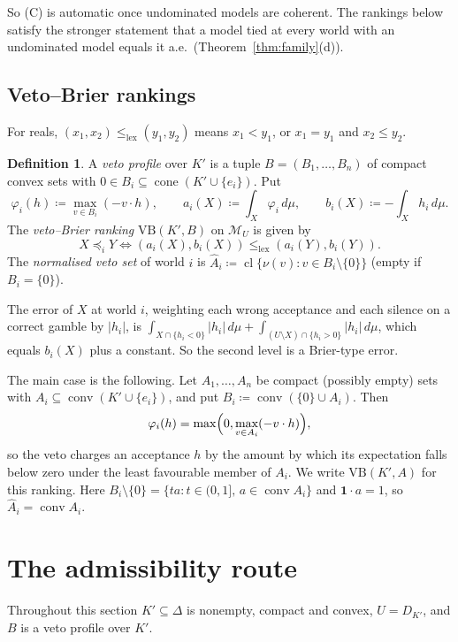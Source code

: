 \documentclass[11pt]{article}
\newcommand{\one}{\mathbf{1}}
\newcommand{\M}{\mathcal{M}}
\newcommand{\lexle}{\le_{\mathrm{lex}}}
\newcommand{\VB}{\mathrm{VB}}
\DeclareMathOperator{\conv}{conv}
\DeclareMathOperator{\cone}{cone}
\DeclareMathOperator{\cl}{cl}
\theoremstyle{plain}
\theoremstyle{definition}
\newtheorem{definition}[theorem]{Definition}
\theoremstyle{remark}
\begin{document}
So (C) is automatic once undominated models are coherent. The rankings below satisfy the
stronger statement that a model tied at every world with an undominated model equals it
a.e.\ (Theorem~\ref{thm:family}(d)).

\subsection{Veto--Brier rankings}

For reals, $(x_1,x_2)\lexle(y_1,y_2)$ means $x_1<y_1$, or $x_1=y_1$ and $x_2\le y_2$.

\begin{definition}\label{def:vb}
A \emph{veto profile} over $K'$ is a tuple $B=(B_1,\dots,B_n)$ of compact convex sets
with $0\in B_i\subseteq\cone(K'\cup\{e_i\})$. Put
\[
  \varphi_i(h)\coloneqq\max_{v\in B_i}(-v\cdot h),\qquad
  a_i(X)\coloneqq\int_X\varphi_i\,d\mu,\qquad
  b_i(X)\coloneqq-\int_Xh_i\,d\mu .
\]
The \emph{veto--Brier ranking} $\VB(K',B)$ on $\M_U$ is given by
\[
  X\preceq_iY\iff(a_i(X),b_i(X))\lexle(a_i(Y),b_i(Y)).
\]
The \emph{normalised veto set} of world $i$ is $\hat A_i\coloneqq\cl\{\nu(v):v\in
B_i\setminus\{0\}\}$ (empty if $B_i=\{0\}$).
\end{definition}

The error of $X$ at world $i$, weighting each wrong acceptance and each silence on a
correct gamble by $|h_i|$, is $\int_{X\cap\{h_i<0\}}|h_i|\,d\mu+\int_{(U\setminus X)
\cap\{h_i>0\}}|h_i|\,d\mu$, which equals $b_i(X)$ plus a constant. So the second level is a
Brier-type error.

The main case is the following. Let $A_1,\dots,A_n$ be compact (possibly empty) sets with
$A_i\subseteq\conv(K'\cup\{e_i\})$, and put $B_i\coloneqq\conv(\{0\}\cup A_i)$. Then
\[
  \varphi_i(h)=\max\Bigl(0,\max_{v\in A_i}(-v\cdot h)\Bigr),
\]
so the veto charges an acceptance $h$ by the amount by which its expectation falls below
zero under the least favourable member of $A_i$. We write $\VB(K',A)$ for this ranking.
Here $B_i\setminus\{0\}=\{ta:t\in(0,1],\,a\in\conv A_i\}$ and $\one\cdot a=1$, so
$\hat A_i=\conv A_i$.

\section{The admissibility route}\label{sec:route}

Throughout this section $K'\subseteq\Delta$ is nonempty, compact and convex, $U=D_{K'}$,
and $B$ is a veto profile over $K'$.
\end{document}
